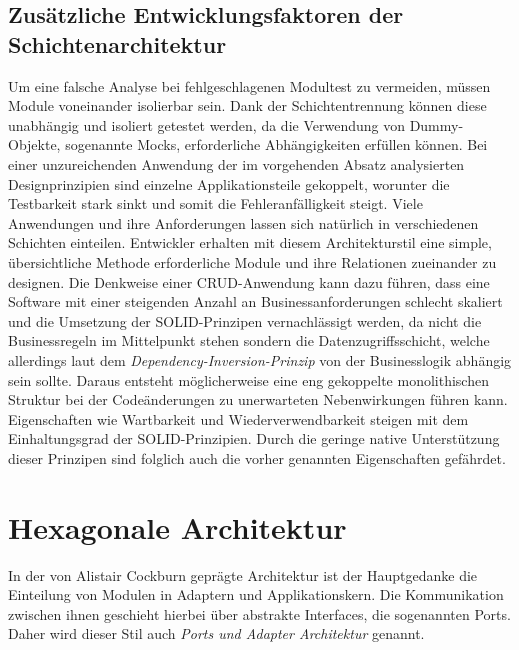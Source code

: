 \documentclass[conference]{IEEEtran}
\begin{document}
\subsection{Zusätzliche Entwicklungsfaktoren der Schichtenarchitektur}


Um eine falsche Analyse bei fehlgeschlagenen Modultest zu vermeiden, müssen Module voneinander isolierbar sein. Dank der Schichtentrennung können diese unabhängig und isoliert getestet werden, da die Verwendung von Dummy-Objekte, sogenannte Mocks, erforderliche Abhängigkeiten erfüllen können. Bei einer unzureichenden Anwendung der im vorgehenden Absatz analysierten Designprinzipien sind einzelne Applikationsteile gekoppelt, worunter die Testbarkeit stark sinkt und somit die Fehleranfälligkeit steigt.
Viele Anwendungen und ihre Anforderungen lassen sich natürlich in verschiedenen Schichten einteilen. Entwickler erhalten mit diesem Architekturstil eine simple, übersichtliche Methode erforderliche Module und ihre Relationen zueinander zu designen. Die Denkweise einer CRUD-Anwendung kann dazu führen, dass eine Software mit einer steigenden Anzahl an Businessanforderungen schlecht skaliert und die Umsetzung der SOLID-Prinzipen vernachlässigt werden, da nicht die Businessregeln im Mittelpunkt stehen sondern die Datenzugriffsschicht, welche allerdings laut dem \emph{Dependency-Inversion-Prinzip} von der Businesslogik abhängig sein sollte. Daraus entsteht möglicherweise eine eng gekoppelte monolithischen Struktur bei der Codeänderungen zu unerwarteten Nebenwirkungen führen kann.
Eigenschaften wie Wartbarkeit und Wiederverwendbarkeit steigen mit dem Einhaltungsgrad der SOLID-Prinzipien. Durch die geringe native Unterstützung dieser Prinzipen sind folglich auch die vorher genannten Eigenschaften gefährdet. 





\section{Hexagonale Architektur}


In der von Alistair Cockburn geprägte Architektur ist der Hauptgedanke die Einteilung von Modulen in Adaptern und Applikationskern. Die Kommunikation zwischen ihnen geschieht hierbei über abstrakte Interfaces, die sogenannten Ports. Daher wird dieser Stil auch \emph{Ports und Adapter Architektur} genannt. 
\end{document}
